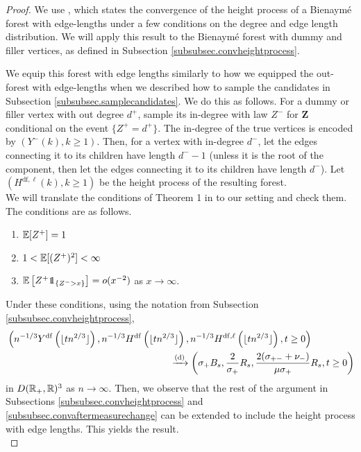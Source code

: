 \begin{proof}
We use \citet[Theorem 1]{deraphelisScalingLimitMultitype2017}, which states the convergence of the height process of a Bienaymé forest with edge-lengths under a few conditions on the degree and edge length distribution. We will apply this result to the Bienaymé forest with dummy and filler vertices, as defined in Subsection \ref{subsubsec.convheightprocess}. 

We equip this forest with edge lengths similarly to how we equipped the out-forest with edge-lengths when we described how to sample the candidates in Subsection \ref{subsubsec.samplecandidates}. We do this as follows. For a dummy or filler vertex with out degree $d^+$, sample its in-degree with law $Z^-$ for $\mathbf{Z}$ conditional on the event $\{Z^+=d^+\}$. The in-degree of the true vertices is encoded by $(Y^{-}(k),k\geq 1)$.  Then, for a vertex with in-degree $d^-$, let the edges connecting it to its children have length $d^--1$ (unless it is the root of the component, then let the edges connecting it to its children have length $d^-$). Let $(H^{\mathrm{df},\ell}(k),k\geq 1)$ be the height process of the resulting forest.\\
We will translate the conditions of Theorem 1 in \cite{deraphelisScalingLimitMultitype2017} to our setting and check them. The conditions are as follows.
\begin{enumerate}
    \item ${\mathbb E}[Z^+]=1$
    \item $1<{\mathbb E}[(Z^+)^2]<\infty$
    \item $\E\left[Z^+\one_{\{Z^->x\}}\right]=o(x^{-2})$ as $x\to \infty$.
\end{enumerate}
Under these conditions, using the notation from Subsection \ref{subsubsec.convheightprocess},
\begin{align}
    \label{eq.convmodifiedheightprocess}
    &\left(n^{-1/3}Y^{\mathrm{df}}\left(\lfloor t n^{2/3}\rfloor \right),n^{-1/3}H^{\mathrm{df}}\left(\lfloor t n^{2/3}\rfloor \right), n^{-1/3}H^{\mathrm{df},\ell}\left(\lfloor t n^{2/3}\rfloor \right),t\geq 0\right) \nonumber \\
    &\hspace{17em} \todist\left(\sigma_+ B_s, \frac{2}{\sigma_+}R_s, \frac{2(\sigma_{+-}+\nu_-)}{\mu\sigma_+}R_s,t\geq 0\right)
\end{align}
in $D({\mathbb R}_+,{\mathbb R})^3$ as $n\to \infty$. 
Then, we observe that the rest of the argument in Subsections \ref{subsubsec.convheightprocess} and  \ref{subsubsec.convaftermeasurechange} can be extended to include the height process with edge lengths. This yields the result.\\

\end{proof}
